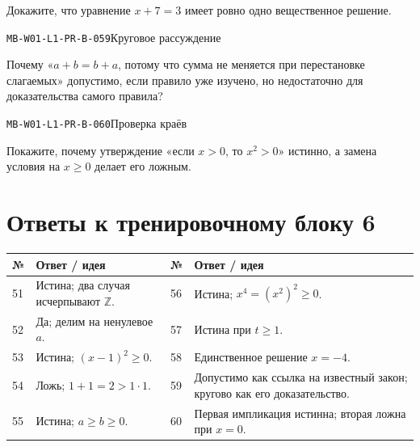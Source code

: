 \documentclass[11pt,a4paper,openany]{book}
\newcommand{\muid}[1]{\texttt{\footnotesize #1}}
\renewcommand{\arraystretch}{1.38}
\begin{document}
Докажите, что уравнение $x+7=3$ имеет ровно одно вещественное решение.\par\medskip

\noindent\hypertarget{MB-W01-L1-PR-B-059}{}\muid{MB-W01-L1-PR-B-059}\quad Круговое рассуждение\par

Почему «$a+b=b+a$, потому что сумма не меняется при перестановке слагаемых» допустимо, если правило уже изучено, но недостаточно для доказательства самого правила?\par\medskip

\noindent\hypertarget{MB-W01-L1-PR-B-060}{}\muid{MB-W01-L1-PR-B-060}\quad Проверка краёв\par

Покажите, почему утверждение «если $x>0$, то $x^2>0$» истинно, а замена условия на $x\ge0$ делает его ложным.\par\medskip

\clearpage\section*{Ответы к тренировочному блоку 6}


\begingroup\footnotesize\renewcommand{\arraystretch}{1.45}

\begin{tabularx}{\textwidth}{@{}p{10mm}X p{10mm}X@{}}\toprule № & Ответ / идея & № & Ответ / идея\\\midrule

51 & Истина; два случая исчерпывают $\mathbb Z$. & 56 & Истина; $x^4=(x^2)^2\ge0$.\\

52 & Да; делим на ненулевое $a$. & 57 & Истина при $t\ge1$.\\

53 & Истина; $(x-1)^2\ge0$. & 58 & Единственное решение $x=-4$.\\

54 & Ложь; $1+1=2>1\cdot1$. & 59 & Допустимо как ссылка на известный закон; кругово как его доказательство.\\

55 & Истина; $a\ge b\ge0$. & 60 & Первая импликация истинна; вторая ложна при $x=0$.\\

\bottomrule\end{tabularx}\endgroup
\end{document}
